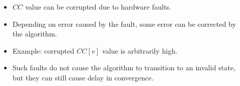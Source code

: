 \begin{columns}
\begin{column}{0.5\textwidth}
{}
\end{column}
\begin{column}{0.5\textwidth}
\begin{itemize}
   \item $CC$ value can be corrupted due to hardware faults.
   \item Depending on error caused by the fault, some error can be corrected by the algorithm.
   \item Example: corrupted $CC[v]$ value is arbitrarily high.
   \item Such faults do not cause the algorithm to transition to an invalid state, but they can still cause delay in convergence. 
   \end{itemize}
\end{column}

\end{columns}
\lyxframeend{}


